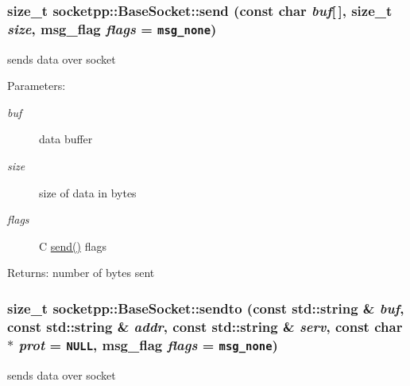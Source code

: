 \begin{CompactItemize}
{\subsubsection[{send}]{\setlength{\rightskip}{0pt plus 5cm}size\_\-t socketpp::BaseSocket::send (const char {\em buf}\mbox{[}$\,$\mbox{]}, \/  size\_\-t {\em size}, \/  msg\_\-flag {\em flags} = {\tt msg\_\-none})}}
\label{classsocketpp_1_1BaseSocket_a63e58c917c6be09f641f9ff1830e74a}


sends data over socket 

\begin{Desc}
\item[Parameters:]
\begin{description}
\item[{\em buf}]data buffer \item[{\em size}]size of data in bytes \item[{\em flags}]C \hyperlink{classsocketpp_1_1BaseSocket_a63e58c917c6be09f641f9ff1830e74a}{send()} flags \end{description}
\end{Desc}
\begin{Desc}
\item[Returns:]number of bytes sent \end{Desc}
\hypertarget{classsocketpp_1_1BaseSocket_f3e7f526290cc37aeaaa1f6686c17ee3}{
\subsubsection[{sendto}]{\setlength{\rightskip}{0pt plus 5cm}size\_\-t socketpp::BaseSocket::sendto (const std::string \& {\em buf}, \/  const std::string \& {\em addr}, \/  const std::string \& {\em serv}, \/  const char $\ast$ {\em prot} = {\tt NULL}, \/  msg\_\-flag {\em flags} = {\tt msg\_\-none})}}
\label{classsocketpp_1_1BaseSocket_f3e7f526290cc37aeaaa1f6686c17ee3}


sends data over socket 


\end{CompactItemize}
